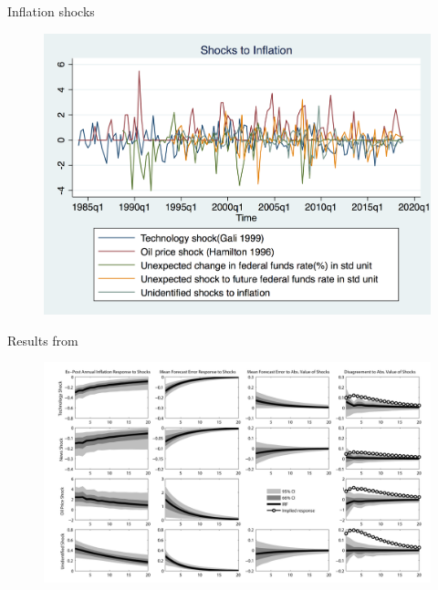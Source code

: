 \documentclass{beamer}
\begin{document}
\begin{frame}{Inflation shocks}

\begin{figure}
	\includegraphics[scale=0.3]{figures/inf_shocksQ.png} 
\end{figure}

\end{frame}

\begin{frame}{Results from \cite{coibion2012can}}

\begin{figure}
	\includegraphics[scale=0.3]{figures/RigidityJPEFigure2.png} 
\end{figure}

\end{frame}
\end{document}
